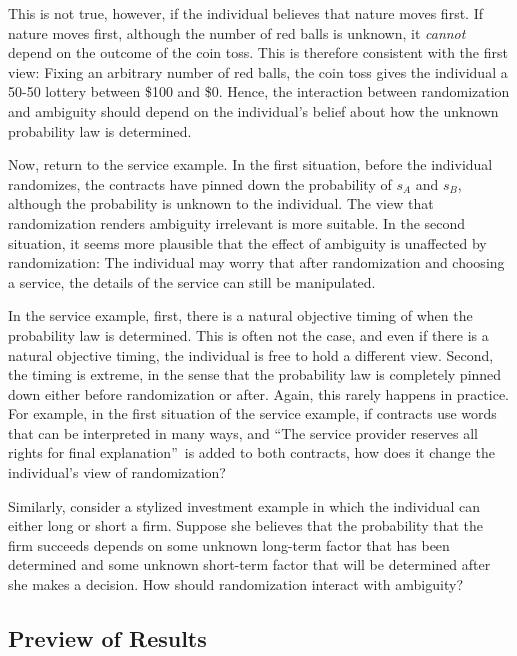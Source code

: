 \documentclass[12pt, notitlepage]{article}
\begin{document}
This is not true, however, if the individual believes that nature moves
first. If nature moves first, although the number of red balls is unknown,
it \textit{cannot} depend on the outcome of the coin toss. This is therefore
consistent with the first view: Fixing an arbitrary number of red balls, the
coin toss gives the individual a 50-50 lottery between \$100 and \$0. Hence,
the interaction between randomization and ambiguity should depend on the
individual's belief about how the unknown probability law is determined.

Now, return to the service example. In the first situation, before the
individual randomizes, the contracts have pinned down the probability of $%
s_{A}$ and $s_{B}$, although the probability is unknown to the individual.
The view that randomization renders ambiguity irrelevant is more suitable.
In the second situation, it seems more plausible that the effect of
ambiguity is unaffected by randomization: The individual may worry that
after randomization and choosing a service, the details of the service can
still be manipulated.

In the service example, first, there is a natural objective timing of when
the probability law is determined. This is often not the case, and even if
there is a natural objective timing, the individual is free to hold a
different view. Second, the timing is extreme, in the sense that the
probability law is completely pinned down either before randomization or
after. Again, this rarely happens in practice. For example, in the first
situation of the service example, if contracts use words that can be
interpreted in many ways, and \textquotedblleft The service provider
reserves all rights for final explanation\textquotedblright\ is added to
both contracts, how does it change the individual's view of randomization?

Similarly, consider a stylized investment example in which the individual
can either long or short a firm. Suppose she believes that the probability
that the firm succeeds depends on some unknown long-term factor that has
been determined and some unknown short-term factor that will be determined
after she makes a decision. How should randomization interact with ambiguity?

\subsection{Preview of Results}
\end{document}
